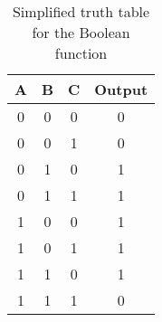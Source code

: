 \begin{table}[H]
    \centering
    \begin{tabular}{|c|c|c|c|}
        \hline
        A & B & C & Output \\
        \hline
        0 & 0 & 0 & 0 \\
        0 & 0 & 1 & 0 \\
        0 & 1 & 0 & 1 \\
        0 & 1 & 1 & 1 \\
        1 & 0 & 0 & 1 \\
        1 & 0 & 1 & 1 \\
        1 & 1 & 0 & 1 \\
        1 & 1 & 1 & 0 \\
        \hline
    \end{tabular}
    \caption{Simplified truth table for the Boolean function}
    \label{tab:simplified_truth_table}
\end{table}

